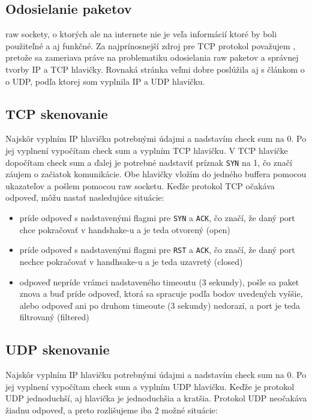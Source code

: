 \documentclass[11pt, a4paper]{article}
\begin{document}
\subsection{Odosielanie paketov}
raw sockety, o ktorých ale na internete nie je veľa informácií ktoré by boli použiteľné a aj funkčné. Za najprínosnejší zdroj pre TCP protokol považujem \cite{tcp_tenouk}, pretože sa zameriava práve na problematiku odosielania raw paketov a správnej tvorby IP a TCP hlavičky. Rovnaká stránka veľmi dobre poslúžila aj s článkom o \cite{udp_tenouk} o UDP, podľa ktorej som vyplnila IP a UDP hlavičku. 

\subsection{TCP skenovanie}
Najskôr vyplním IP hlavičku potrebnými údajmi a nadstavím check sum na 0. Po jej vyplnení vypočítam check sum a vyplním TCP hlavičku. V TCP hlavičke dopočítam check sum a ďalej je potrebné nadstaviť príznak \texttt{SYN} na 1, čo značí záujem o začiatok komunikácie. Obe hlavičky vložím do jedného buffera pomocou ukazateľov a pošlem pomocou raw socketu. Keďže protokol TCP očakáva odpoveď, môžu nastať nasledujúce situácie:

\begin{itemize}
\item príde odpoveď s nadstavenými flagmi pre \texttt{SYN} a \texttt{ACK}, čo značí, že daný port chce pokračovať v handshake-u a je teda otvorený (open)
\item príde odpoveď s nadstavenými flagmi pre \texttt{RST} a \texttt{ACK}, čo značí, že daný port nechce pokračovať v handhsake-u a je teda uzavretý (closed)
\item odpoveď nepríde vrámci nadstaveného timeoutu (3 sekundy), pošle sa paket znova a buď príde odpoveď, ktorá sa spracuje podľa bodov uvedených vyššie, alebo odpoveď ani po druhom timeoute (3 sekundy) nedorazí, a port je teda filtrovaný (filtered)
\end{itemize}

\subsection{UDP skenovanie}
Najskôr vyplním IP hlavičku potrebnými údajmi a nadstavím check sum na 0. Po jej vyplnení vypočítam check sum a vyplním UDP hlavičku. Keďže je protokol UDP jednoduchší, aj hlavička je jednoduchšia a kratšia. Protokol UDP neočakáva žiadnu odpoveď, a preto rozlišujeme iba 2 možné situácie:
\end{document}
